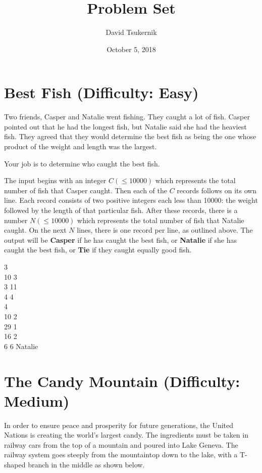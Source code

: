 \documentclass{problem-set}
\title{Problem Set}
\date{October 5, 2018}
\author{David Tsukernik}
\begin{document}
\maketitle

\section{Best Fish (Difficulty: Easy)}
Two friends, Casper and Natalie went fishing. They caught a lot of fish. Casper pointed out that he had the longest fish, but Natalie said she had the heaviest fish. They agreed that they would determine the best fish as being the one whose product of the weight and length was the largest.

Your job is to determine who caught the best fish.

The input begins with an integer $C (\leq10000)$ which represents the total number of fish that Casper caught. Then each of the $C$ records follows on its own line. Each record consists of two positive integers each less than 10000: the weight followed by the length of that particular fish. After these records, there is a number $N (\leq10000)$ which represents the total number of fish that Natalie caught.
On the next $N$ lines, there is one record per line, as outlined above.
\outputformat
The output will be \textbf{Casper} if he has caught the best fish, or  \textbf{Natalie} if she has caught the best fish, or  \textbf{Tie} if they caught equally good fish.

\pushnewpage

\addsample
{
3\\
10 3\\
3 11\\
4 4\\
4\\
10 2\\
29 1\\
16 2\\
6 6
}
{
Natalie
}

\section{The Candy Mountain (Difficulty: Medium)}
In order to ensure peace and prosperity for future generations, the United Nations is creating the world's largest candy. The ingredients must be taken in railway cars from the top of a mountain and poured into Lake Geneva. The railway system goes steeply from the mountaintop down to the lake, with a T-shaped branch in the middle as shown below.
\end{document}
